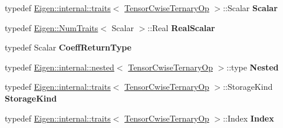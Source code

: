 \begin{DoxyCompactItemize}
\mbox{\label{class_eigen_1_1_tensor_cwise_ternary_op_aa614f75a90955515aca655c235c265a7}} 
typedef \hyperlink{struct_eigen_1_1internal_1_1traits}{Eigen\+::internal\+::traits}$<$ \hyperlink{class_eigen_1_1_tensor_cwise_ternary_op}{Tensor\+Cwise\+Ternary\+Op} $>$\+::Scalar {\bfseries Scalar}
\item 
\mbox{\label{class_eigen_1_1_tensor_cwise_ternary_op_a699120599172d21e180c1d225d5be8d3}} 
typedef \hyperlink{group___core___module_struct_eigen_1_1_num_traits}{Eigen\+::\+Num\+Traits}$<$ Scalar $>$\+::Real {\bfseries Real\+Scalar}
\item 
\mbox{\label{class_eigen_1_1_tensor_cwise_ternary_op_a635a3636bd33daf89bd3b8ba7ce8d8d3}} 
typedef Scalar {\bfseries Coeff\+Return\+Type}
\item 
\mbox{\label{class_eigen_1_1_tensor_cwise_ternary_op_af36d41e63405bbc2d9f04459fdba127d}} 
typedef \hyperlink{struct_eigen_1_1internal_1_1nested}{Eigen\+::internal\+::nested}$<$ \hyperlink{class_eigen_1_1_tensor_cwise_ternary_op}{Tensor\+Cwise\+Ternary\+Op} $>$\+::type {\bfseries Nested}
\item 
\mbox{\label{class_eigen_1_1_tensor_cwise_ternary_op_a253e04fe3005aaf9836d44e60e9bba5a}} 
typedef \hyperlink{struct_eigen_1_1internal_1_1traits}{Eigen\+::internal\+::traits}$<$ \hyperlink{class_eigen_1_1_tensor_cwise_ternary_op}{Tensor\+Cwise\+Ternary\+Op} $>$\+::Storage\+Kind {\bfseries Storage\+Kind}
\item 
\mbox{\label{class_eigen_1_1_tensor_cwise_ternary_op_aa2c55a3cab4374f31060a8f68791966e}} 
typedef \hyperlink{struct_eigen_1_1internal_1_1traits}{Eigen\+::internal\+::traits}$<$ \hyperlink{class_eigen_1_1_tensor_cwise_ternary_op}{Tensor\+Cwise\+Ternary\+Op} $>$\+::Index {\bfseries Index}
\end{DoxyCompactItemize}
